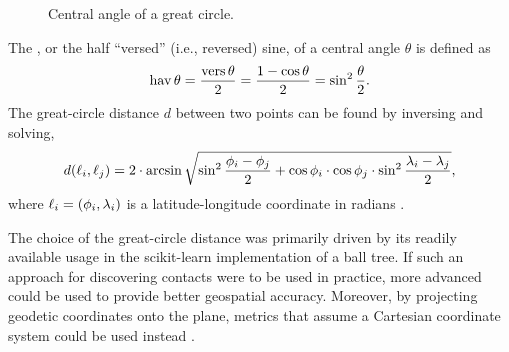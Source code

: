 
\begin{figure}[htbp]
\centering
{}
\caption[Central angle of a great circle]{Central angle of a great circle.}
\label{fig:central-angle}
\end{figure}

The , or the half ``versed'' (i.e., reversed) sine, of a central angle $\theta$ is defined as
\begin{equation}
  \operatorname{hav} \theta = \frac{\operatorname{vers} \theta}{2}  = \frac{1 - \cos \theta}{2}= \sin^2 \frac{\theta}{2}. \label{eq:hav}
\end{equation}
The great-circle distance $d$ between two points can be found by inversing  and solving,
\begin{equation*}
  d(\ell_i, \ell_j) = 2 \cdot \arcsin \sqrt{\sin^2 \frac{\phi_i - \phi_j}{2} + \cos \phi_i \cdot \cos\phi_j \cdot \sin^2 \frac{\lambda_i - \lambda_j}{2}},
\end{equation*}
where $\ell_i = (\phi_i, \lambda_i)$ is a latitude-longitude coordinate in radians \cite[pp. 157--162]{Brummelen2013}.

The choice of the great-circle distance was primarily driven by its readily available usage in the scikit-learn \citep{sklearn2013} implementation of a ball tree. If such an approach for discovering contacts were to be used in practice, more advanced  \cite[pp. 71--130]{Lu2014} could be used to provide better geospatial accuracy. Moreover, by projecting geodetic coordinates onto the plane, metrics that assume a Cartesian coordinate system could be used instead \cite[pp. 265--326]{Lu2014}.

